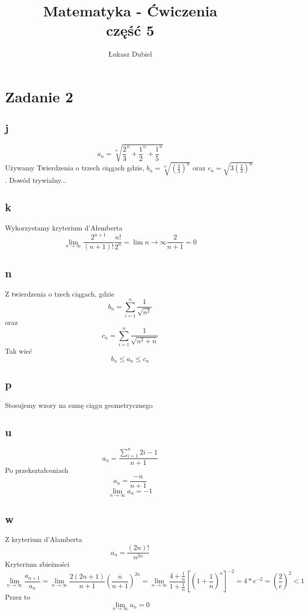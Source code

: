 \documentclass{article}
\author{Łukasz Dubiel}
\title{Matematyka - Ćwiczenia \\ część 5}
\begin{document}
\maketitle

\section{Zadanie 2}
\subsection{j}
$$a_n = \sqrt[n]{\frac{2}{3}^n + \frac{1}{2}^n + \frac{1}{5}^n}$$
Używamy Twierdzenia o trzech ciągach gdzie, $ b_n = \sqrt[n]{(\frac{2}{3})^n}$ oraz $c_n = \sqrt{3(\frac{2}{3})^n}$ . 
Dowód trywialny...
\subsection{k}
Wykorzystamy kryterium d'Alemberta
$$\lim_{n \to \infty}{\frac{2^{n+1}}{(n+1)!} \frac{n!}{2^n}} = \lim{n \to \infty}{\frac{2}{n+1}} = 0 $$
\subsection{n}
Z twierdzenia o tzech ciągach, gdzie $$ b_n = \sum_{i=1}^{n}{\frac{1}{\sqrt{n^2}}} $$
oraz $$ c_n = \sum_{i=1}^{n}{\frac{1}{\sqrt{n^2 + n}}} $$
Tak wieć $$b_n \leq a_n \leq c_n$$
\subsection{p}
Stosujemy wzory na sumę ciągu geometrycznego

\subsection{u}
$$ a_n = \frac{\sum_{i=1}^{n}{2i-1}}{n+1}$$
Po przekształceniach
$$ a_n = \frac{-n}{n+1} $$
$$ \lim_{n \to \infty}{a_n} = -1 $$
\subsection{w}
Z kryterium d'Alamberta
$$a_n = \frac{(2n)!}{n^{2n}} $$
Kryterium zbieżności
$$\lim_{n \to \infty}{\frac{a_{n+1}}{a_n}} = \lim_{n \to \infty}{\frac{2(2n +1)}{n+1} \left( \frac{n}{n+1} \right) ^{2n}} = \lim_{n \to \infty}{\frac{4 + \frac{1}{n}}{1 + \frac{1}{n}} \left[ \left( 1+\frac{1}{n} \right) ^n \right] ^{-2}} = 4 * e^{-2} = \left(\frac{2}{e}\right)^2 < 1$$
Przez to 
$$\lim_{n \to \infty}{a_n} = 0 $$
\end{document}
